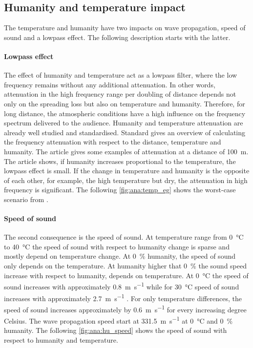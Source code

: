 \subsection{Humanity and temperature impact}\label{sec:ana:hu_temp}
The temperature and humanity have two impacts on wave propagation, speed of sound and a lowpass effect. The following description starts with the latter. 

\paragraph{Lowpass effect} The effect of humanity and temperature act as a lowpass filter, where the low frequency remains without any additional attenuation. In other words, attenuation in the high frequency range per doubling of distance depends not only on the spreading loss but also on temperature and humanity. Therefore, for long distance, the atmospheric conditions have a high influence on the frequency spectrum delivered to the audience. Humanity and temperature attenuation are already well studied and standardised. Standard \citep{iso_9613-1} gives an overview of calculating the frequency attenuation with respect to the distance, temperature and humanity. The article \citep{corteel2017large} gives some examples of attenuation at a distance of \SI{100}{\meter}. The article shows, if humanity increases proportional to the temperature, the lowpass effect is small. If the change in temperature and humanity is the opposite of each other, for example, the high temperature but dry, the attenuation in high frequency is significant. The following \autoref{fig:ana:temp_eg} shows the worst-case scenario from \citep{corteel2017large}.

 
\paragraph{Speed of sound} The second consequence is the speed of sound. At temperature range from \SI{0}{\celsius} to \SI{40}{\celsius} the speed of sound with respect to humanity change is sparse and mostly depend on temperature change. At \SI{0}{\percent} humanity, the speed of sound only depends on the temperature. At humanity higher that \SI{0}{\percent} the sound speed increase with respect to humanity, depends on temperature. At \SI{0}{\celsius} the speed of sound increases with approximately \SI{0.8}{\meter\per\second} while for \SI{30}{\celsius} speed of sound increases with approximately \SI{2.7}{\meter\per\second} \citep{humanity_effect_on_speed} \citep{bohn1987environmental}. For only temperature differences, the speed of sound increases approximately by \SI{0.6}{\meter\per\second} for every increasing degree Celsius. The wave propagation speed start at \SI{331.5}{\meter\per\second} at \SI{0}{\celsius} and \SI{0}{\percent} humanity. The following \autoref{fig:ana:hu_speed} shows the speed of sound with respect to humanity and temperature. 

